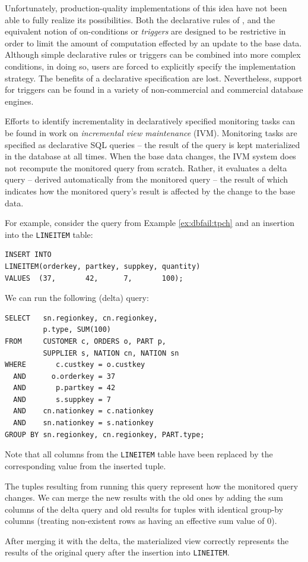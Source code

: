 Unfortunately, production-quality implementations of this idea have not been able to fully realize its possibilities.  Both the declarative rules of \cite{morgenstern1983active}, and the equivalent notion of on-conditions\cite{taylor1976codasyl} or {\em triggers}\cite{mccarthy1989architecture} are designed to be restrictive in order to limit the amount of computation effected by an update to the base data.  Although simple declarative rules or triggers can be combined into more complex conditions\cite{DBLP:conf/icde/ZimmerU99}, in doing so, users are forced to explicitly specify the implementation strategy.  The benefits of a declarative specification are lost.  Nevertheless, support for triggers can be found in a variety of non-commercial\cite{stonebraker1991postgres,mysql1mysql} and commercial\cite{oracle,graymicrosoft,gassner1993query} database engines.

Efforts to identify incrementality in declaratively specified monitoring tasks can be found in work on {\em incremental view maintenance} (IVM)\cite{gupta1993maintaining,ceri1991deriving}.  Monitoring tasks are specified as declarative SQL queries -- the result of the query is kept materialized in the database at all times.  When the base data changes, the IVM system does not recompute the monitored query from scratch.  Rather, it evaluates a delta query -- derived automatically from the monitored query -- the result of which indicates how the monitored query's result is affected by the change to the base data.

\begin{example}
For example, consider the query from Example \ref{ex:dbfail:tpch} and an insertion into the {\tt LINEITEM} table:
\begin{verbatim}
INSERT INTO 
LINEITEM(orderkey, partkey, suppkey, quantity)
VALUES  (37,       42,      7,       100);
\end{verbatim}

We can run the following (delta) query:
\begin{verbatim}
SELECT   sn.regionkey, cn.regionkey,
         p.type, SUM(100) 
FROM     CUSTOMER c, ORDERS o, PART p, 
         SUPPLIER s, NATION cn, NATION sn
WHERE       c.custkey = o.custkey
  AND      o.orderkey = 37
  AND       p.partkey = 42
  AND       s.suppkey = 7
  AND    cn.nationkey = c.nationkey
  AND    sn.nationkey = s.nationkey
GROUP BY sn.regionkey, cn.regionkey, PART.type;
\end{verbatim}

Note that all columns from the {\tt LINEITEM} table have been replaced by the corresponding value from the inserted tuple.  

The tuples resulting from running this query represent how the monitored query changes.  We can merge the new results with the old ones by adding the sum columns of the delta query and old results for tuples with identical group-by columns (treating non-existent rows as having an effective sum value of 0).

After merging it with the delta, the materialized view correctly represents the results of the original query after the insertion into {\tt LINEITEM}.
\end{example}

